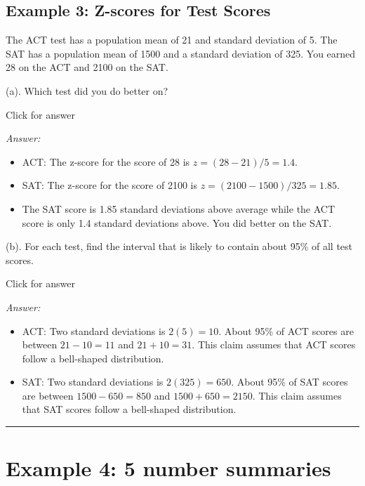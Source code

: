 \documentclass[
]{book}
\providecommand{\tightlist}{%
  \setlength{\itemsep}{0pt}\setlength{\parskip}{0pt}}
\begin{document}
\hypertarget{example-3-z-scores-for-test-scores}{%
\subsection{Example 3: Z-scores for Test Scores}\label{example-3-z-scores-for-test-scores}}

The ACT test has a population mean of 21 and standard deviation of 5. The SAT has a population mean of 1500 and a standard deviation of 325. You earned 28 on the ACT and 2100 on the SAT.

(a). Which test did you do better on?

Click for answer

\emph{Answer:}

\begin{itemize}
\tightlist
\item
  ACT: The z-score for the score of 28 is \(z = (28 - 21)/5 = 1.4.\)
\item
  SAT: The z-score for the score of 2100 is \(z = (2100 - 1500)/325 = 1.85.\)
\item
  The SAT score is 1.85 standard deviations above average while the ACT score is only 1.4 standard deviations above. You did better on the SAT.
\end{itemize}

(b). For each test, find the interval that is likely to contain about 95\% of all test scores.

Click for answer

\emph{Answer:}

\begin{itemize}
\item
  ACT: Two standard deviations is \(2(5) = 10.\) About 95\% of ACT scores are between \(21 - 10 = 11\) and \(21 + 10 = 31.\) This claim assumes that ACT scores follow a bell-shaped distribution.
\item
  SAT: Two standard deviations is \(2(325) = 650.\) About 95\% of SAT scores are between \(1500 - 650 = 850\) and \(1500 + 650 = 2150\). This claim assumes that SAT scores follow a bell-shaped distribution.
\end{itemize}

\begin{center}\rule{0.5\linewidth}{0.5pt}\end{center}

\hypertarget{example-4-5-number-summaries}{%
\section{Example 4: 5 number summaries}\label{example-4-5-number-summaries}}
\end{document}
